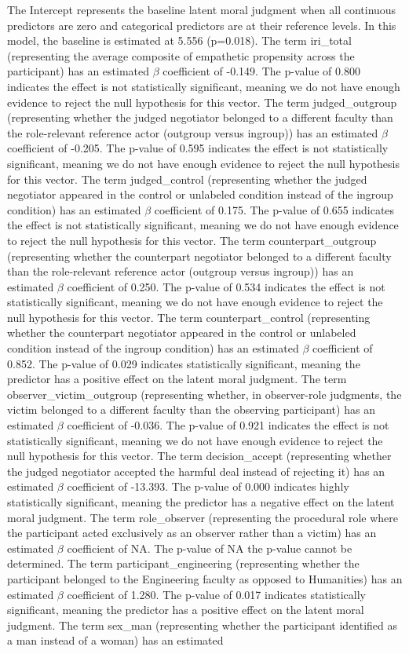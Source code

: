 \documentclass[11pt]{article}
\begin{document}
The Intercept represents the baseline latent moral judgment when all continuous predictors are zero and categorical predictors are at their reference levels. In this model, the baseline is estimated at 5.556 (p=0.018). The term iri\_total (representing the average composite of empathetic propensity across the participant) has an estimated $\beta$ coefficient of -0.149. The p-value of 0.800 indicates the effect is not statistically significant, meaning we do not have enough evidence to reject the null hypothesis for this vector. The term judged\_outgroup (representing whether the judged negotiator belonged to a different faculty than the role-relevant reference actor (outgroup versus ingroup)) has an estimated $\beta$ coefficient of -0.205. The p-value of 0.595 indicates the effect is not statistically significant, meaning we do not have enough evidence to reject the null hypothesis for this vector. The term judged\_control (representing whether the judged negotiator appeared in the control or unlabeled condition instead of the ingroup condition) has an estimated $\beta$ coefficient of 0.175. The p-value of 0.655 indicates the effect is not statistically significant, meaning we do not have enough evidence to reject the null hypothesis for this vector. The term counterpart\_outgroup (representing whether the counterpart negotiator belonged to a different faculty than the role-relevant reference actor (outgroup versus ingroup)) has an estimated $\beta$ coefficient of 0.250. The p-value of 0.534 indicates the effect is not statistically significant, meaning we do not have enough evidence to reject the null hypothesis for this vector. The term counterpart\_control (representing whether the counterpart negotiator appeared in the control or unlabeled condition instead of the ingroup condition) has an estimated $\beta$ coefficient of 0.852. The p-value of 0.029 indicates statistically significant, meaning the predictor has a positive effect on the latent moral judgment. The term observer\_victim\_outgroup (representing whether, in observer-role judgments, the victim belonged to a different faculty than the observing participant) has an estimated $\beta$ coefficient of -0.036. The p-value of 0.921 indicates the effect is not statistically significant, meaning we do not have enough evidence to reject the null hypothesis for this vector. The term decision\_accept (representing whether the judged negotiator accepted the harmful deal instead of rejecting it) has an estimated $\beta$ coefficient of -13.393. The p-value of 0.000 indicates highly statistically significant, meaning the predictor has a negative effect on the latent moral judgment. The term role\_observer (representing the procedural role where the participant acted exclusively as an observer rather than a victim) has an estimated $\beta$ coefficient of NA. The p-value of NA the p-value cannot be determined. The term participant\_engineering (representing whether the participant belonged to the Engineering faculty as opposed to Humanities) has an estimated $\beta$ coefficient of 1.280. The p-value of 0.017 indicates statistically significant, meaning the predictor has a positive effect on the latent moral judgment. The term sex\_man (representing whether the participant identified as a man instead of a woman) has an estimated 
\end{document}
